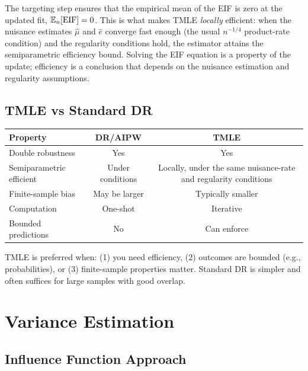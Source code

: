 The targeting step ensures that the empirical mean of the EIF is zero at the updated fit, $\mathbb{E}_n[\text{EIF}] = 0$. This is what makes TMLE \emph{locally} efficient: when the nuisance estimates $\hat\mu$ and $\hat e$ converge fast enough (the usual $n^{-1/4}$ product-rate condition) and the regularity conditions hold, the estimator attains the semiparametric efficiency bound. Solving the EIF equation is a property of the update; efficiency is a conclusion that depends on the nuisance estimation and regularity assumptions.

\subsection{TMLE vs Standard DR}

\begin{center}
\begin{tabular}{lcc}
\toprule
Property & DR/AIPW & TMLE \\
\midrule
Double robustness & Yes & Yes \\
Semiparametric efficient & Under conditions & Locally, under the same nuisance-rate and regularity conditions \\
Finite-sample bias & May be larger & Typically smaller \\
Computation & One-shot & Iterative \\
Bounded predictions & No & Can enforce \\
\bottomrule
\end{tabular}
\end{center}

\begin{insight}
TMLE is preferred when: (1) you need efficiency, (2) outcomes are bounded (e.g., probabilities), or (3) finite-sample properties matter. Standard DR is simpler and often suffices for large samples with good overlap.
\end{insight}

\section{Variance Estimation}
\label{sec:weighting_variance}

\subsection{Influence Function Approach}

